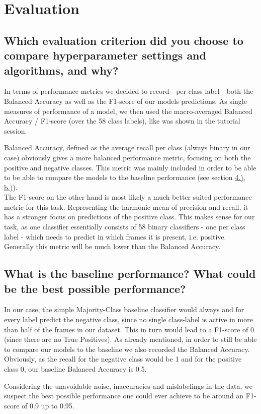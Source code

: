 
\section{Evaluation}
\label{sec:Evaluation}






\subsection{Which evaluation criterion did you choose to compare hyperparameter settings and algorithms, and why? }
\label{sec:Evaluation:a}

In terms of performance metrics we decided to record - per class label - both the Balanced Accuracy as well as the F1-score of our models predictions. As single measures of performance of a model, we then used the macro-averaged Balanced Accuracy / F1-score (over the 58 class labels), like was shown in the tutorial session. 

Balanced Accuracy, defined as the average recall per class (always binary in our case) obviously gives a more balanced performance metric, focusing on both the positive and negative classes. This metric was mainly included in order to be able to be able to compare the models to the baseline performance (see section \hyperref[sec:Evaluation:b]{4.), b.)}).\\
The F1-score on the other hand is most likely a much better suited performance metric for this task. Representing the harmonic mean of precision and recall, it has a stronger focus on predictions of the positive class. This makes sense for our task, as one classifier essentially consists of 58 binary classifiers - one per class label - which needs to predict in which frames it is present, i.e. positive. Generally this metric will be much lower than the Balanced Accuracy.


\subsection{What is the baseline performance? What could be the best possible performance? }
\label{sec:Evaluation:b}

In our case, the simple Majority-Class baseline classifier would always and for every label predict the negative class, since no single class-label is active in more than half of the frames in our dataset. This in turn would lead to a F1-score of 0 (since there are no True Positives). As already mentioned, in order to still be able to compare our models to the baseline we also recorded the Balanced Accuracy. Obviously, as the recall for the negative class would be 1 and for the positive class 0, our baseline Balanced Accuracy is 0.5.

Considering the unavoidable noise, inaccuracies and mislabelings in the data, we suspect the best possible performance one could ever achieve to be around an F1-score of 0.9 up to 0.95.



